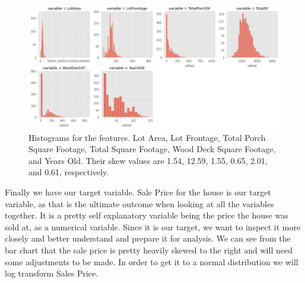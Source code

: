 \documentclass{article}
\begin{document}
	\begin{figure}
		\includegraphics[width=\textwidth]{skewplots}
		\caption{Histograms for the features. Lot Area, Lot Frontage, Total Porch Square Footage, Total Square Footage, Wood Deck Square Footage, and Years Old. Their skew values are 1.54, 12.59, 1.55, 0.65, 2.01, and 0.61, respectively.}
		\label{fig:skew}
	\end{figure}
	
	Finally we have our target variable. Sale Price for the house is our target variable, as that is the ultimate outcome when looking at all the variables together. It is a pretty self explanatory variable being the price the house was sold at, as a numerical variable. Since it is our target, we want to inspect it more closely and better understand and prepare it for analysis. We can see from the bar chart that the sale price is pretty heavily skewed to the right and will need some adjustments to be made. In order to get it to a normal distribution we will log transform Sales Price.

\end{document}
